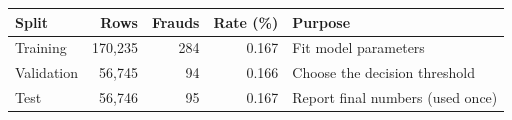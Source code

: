 \begin{tabular}{l r r r l}
\hline
\textbf{Split} & \textbf{Rows} & \textbf{Frauds} & \textbf{Rate (\%)} & \textbf{Purpose} \\
\hline
Training & 170{,}235 & 284 & 0.167 & Fit model parameters \\
Validation & 56{,}745 & 94 & 0.166 & Choose the decision threshold \\
Test & 56{,}746 & 95 & 0.167 & Report final numbers (used once) \\
\hline
\end{tabular}